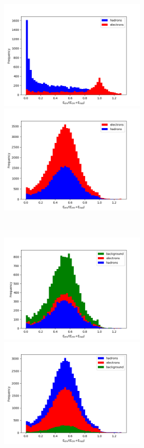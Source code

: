\begin{figure}
\centering
\begin{minipage}{0.45\textwidth}
\includegraphics[width=7cm]{ratio.png}
\end{minipage}
\begin{minipage}{0.45\textwidth}
\includegraphics[width=7cm]{emhadbinary.png}
\end{minipage}
\\
\begin{minipage}{0.45\textwidth}
\includegraphics[width=7cm]{emhadsingle.png}
\end{minipage}
\begin{minipage}{0.45\textwidth}
\includegraphics[width=7cm]{emhadisolated.png}

\end{minipage}
\end{figure}
